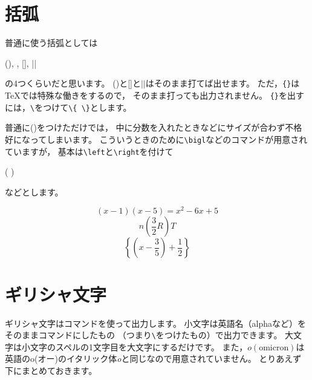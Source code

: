 \documentclass[class=jreport, crop=false, preview=false, dvipdfmx, fleqn]{standalone}
\begin{document}
\section{括弧}
普通に使う括弧としては
\begin{ITeX}
(), {}, [], ||
\end{ITeX}
の4つくらいだと思います。
()と[]と$||$はそのまま打てば出せます。
ただ，\verb|{}|は{\TeX}では特殊な働きをするので，
そのまま打っても出力されません。
\verb|{}|を出すには，\verb|\|をつけて\verb|\{ \}|とします。

普通に()をつけただけでは，
中に分数を入れたときなどにサイズが合わず不格好になってしまいます。
こういうときのために\verb|\bigl|などのコマンドが用意されていますが，
基本は\verb|\left|と\verb|\right|を付けて
\begin{ITeX}
\left( \right)
\end{ITeX}
などとします。

\begin{IOTeX*}
\[ (x - 1)(x - 5) = x^2 - 6x + 5 \]
\[ n \left( \frac{3}{2} R \right) T  \]
\[ \left\{ \left( x - \frac{3}{5} \right) + \frac{1}{2} \right\} \]
\end{IOTeX*}



\section{ギリシャ文字}
ギリシャ文字はコマンドを使って出力します。
小文字は英語名（alphaなど）をそのままコマンドにしたもの
（つまり\verb|\|をつけたもの）で出力できます。
大文字は小文字のスペルの1文字目を大文字にするだけです。
また，$o (\text{omicron})$は英語のo(オー)のイタリック体\textit{o}と同じなので用意されていません。
とりあえず下にまとめておきます。
\end{document}
